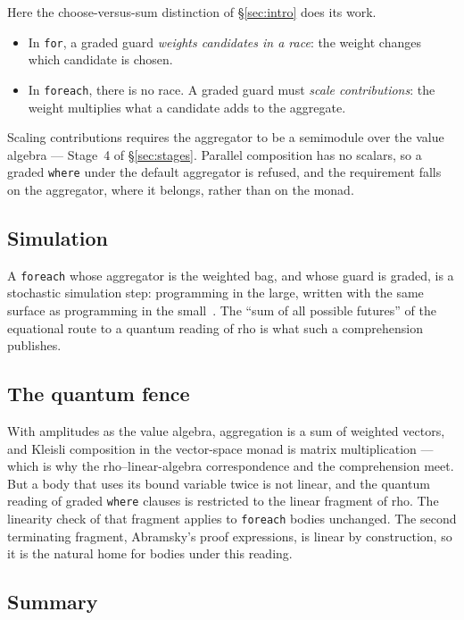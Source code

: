 \documentclass[11pt]{article}
\theoremstyle{branddef}
\theoremstyle{brandplain}
\theoremstyle{brandrem}
\newcommand{\rhoc}{\textsf{rho}}
\newcommand{\fe}{\texttt{foreach}}
\begin{document}
Here the choose-versus-sum distinction of \S\ref{sec:intro} does its work.
\begin{itemize}[nosep]
\item In \texttt{for}, a graded guard \emph{weights candidates in a race}: the
weight changes which candidate is chosen.
\item In \fe{}, there is no race. A graded guard must \emph{scale
contributions}: the weight multiplies what a candidate adds to the aggregate.
\end{itemize}
Scaling contributions requires the aggregator to be a semimodule over the value
algebra --- Stage~4 of \S\ref{sec:stages}. Parallel composition has no scalars,
so a graded \texttt{where} under the default aggregator is refused, and the
requirement falls on the aggregator, where it belongs, rather than on the
monad.

\subsection{Simulation}

A \fe{} whose aggregator is the weighted bag, and whose guard is graded, is a
stochastic simulation step: programming in the large, written with the same
surface as programming in the small~\cite{WeightedGSLT}. The ``sum of all
possible futures'' of the equational route to a quantum reading of \rhoc{} is
what such a comprehension publishes.

\subsection{The quantum fence}

With amplitudes as the value algebra, aggregation is a sum of weighted vectors,
and Kleisli composition in the vector-space monad is matrix multiplication ---
which is why the rho--linear-algebra correspondence and the comprehension meet.
But a body that uses its bound variable twice is not linear, and the quantum
reading of graded \texttt{where} clauses is restricted to the linear fragment of
\rhoc{}. The linearity check of that fragment applies to \fe{} bodies unchanged.
The second terminating fragment, Abramsky's proof expressions, is linear by
construction, so it is the natural home for bodies under this reading.

\subsection{Summary}
\end{document}
